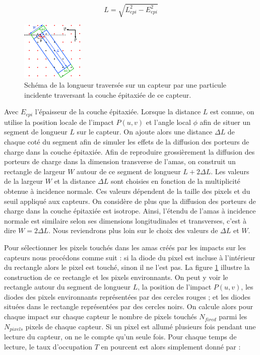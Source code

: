   \begin{equation}
   L = \sqrt{L_{epi}^2-E_{epi}^2}
  \end{equation}
  
  \begin{figure}[!htb]
    \begin{center}
      \includegraphics[scale=5.0]{./figures/schema_rectangle.pdf}
      \caption{Sch\'ema de la longueur travers\'ee sur un capteur par une particule incidente traversant la couche \'epitaxi\'ee de ce capteur.}
      \label{fig:SchemaRectangle}
    \end{center}
  \end{figure}
  
  Avec $E_{epi}$ l'\'epaisseur de la couche \'epitaxi\'ee.  Lorsque la distance $L$ est connue, on utilise la position locale de l'impact $P(u,v)$ et l'angle local $\phi$ afin de situer un segment de longueur $L$ sur le capteur. On ajoute alors une distance $\Delta L$ de chaque cot\'e du segment afin de simuler les effets de la diffusion des porteurs de charge dans la couche \'epitaxi\'ee. Afin de reproduire grossi\`erement la diffusion des porteurs de charge dans la dimension transverse de l'amas, on construit un rectangle de largeur $W$ autour de ce segment de longueur $L + 2 \Delta L$. Les valeurs de la largeur $W$ et la distance $\Delta L$ sont choisies en fonction de la multiplicit\'e obtenue \`a incidence normale. Ces valeurs d\'ependent de la taille des pixels et du seuil appliqu\'e aux capteurs. On consid\`ere de plus que la diffusion des porteurs de charge dans la couche \'epitaxi\'ee est isotrope. Ainsi, l'\'etendu de l'amas \`a incidence normale est similaire selon ses dimensions longitudinales et transverses, c'est \`a dire $W = 2 \Delta L$. Nous reviendrons plus loin sur le choix des valeurs de $\Delta L$ et $W$.
  
  \medskip
  
  Pour s\'electionner les pixels touch\'es dans les amas cr\'e\'es par les impacts sur les capteurs nous proc\'edons comme suit : si la diode du pixel est incluse \`a l'int\'erieur du rectangle alors le pixel est touch\'e, sinon il ne l'est pas. La figure \ref{fig:SchemaRectangle} illustre la construction de ce rectangle et les pixels environnants. On peut y voir le rectangle autour du segment de longueur $L$, la position de l'impact $P(u,v)$, les diodes des pixels environnants repr\'esent\'ees par des cercles rouges ; et les diodes situ\'ees dans le rectangle repr\'esent\'ees par des cercles noirs. On calcule alors pour chaque impact sur chaque capteur le nombre de pixels touch\'es $N_{fired}$ parmi les $N_{pixels}$ pixels de chaque capteur. Si un pixel est allum\'e plusieurs fois pendant une lecture du capteur, on ne le compte qu'un seule fois. Pour chaque temps de lecture, le taux d'occupation $T$ en pourcent est alors simplement donn\'e par : 
  
